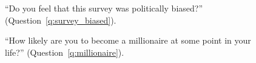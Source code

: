 
\begin{figure}[h!]
    \caption[Feeling that the survey was politically biased]{``Do you feel that this survey was politically biased?'' (Question~\ref{q:survey_biased}).
    }\label{fig:survey_biased}
\end{figure}


\begin{figure}[h!]
    \caption[Likelihood of becoming a millionaire]{``How likely are you to become a millionaire at some point in your life?'' (Question~\ref{q:millionaire}).
    }\label{fig:millionaire}
\end{figure}

